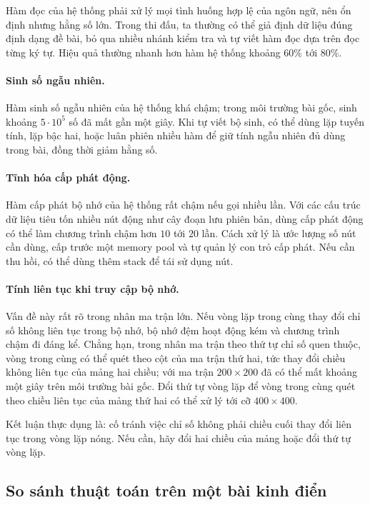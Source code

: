 \documentclass[11pt]{article}
\begin{document}
Hàm đọc của hệ thống phải xử lý mọi tình huống hợp lệ của ngôn ngữ, nên ổn
định nhưng hằng số lớn. Trong thi đấu, ta thường có thể giả định dữ liệu đúng
định dạng đề bài, bỏ qua nhiều nhánh kiểm tra và tự viết hàm đọc dựa trên đọc
từng ký tự. Hiệu quả thường nhanh hơn hàm hệ thống khoảng \(60\%\) tới \(80\%\).

\paragraph{Sinh số ngẫu nhiên.}
Hàm sinh số ngẫu nhiên của hệ thống khá chậm; trong môi trường bài gốc, sinh
khoảng \(5\cdot10^5\) số đã mất gần một giây. Khi tự viết bộ sinh, có thể dùng
lặp tuyến tính, lặp bậc hai, hoặc luân phiên nhiều hàm để giữ tính ngẫu nhiên
đủ dùng trong bài, đồng thời giảm hằng số.

\paragraph{Tĩnh hóa cấp phát động.}
Hàm cấp phát bộ nhớ của hệ thống rất chậm nếu gọi nhiều lần. Với các cấu trúc
dữ liệu tiêu tốn nhiều nút động như cây đoạn lưu phiên bản, dùng cấp phát động
có thể làm chương trình chậm hơn \(10\) tới \(20\) lần. Cách xử lý là ước lượng
số nút cần dùng, cấp trước một memory pool và tự quản lý con trỏ cấp phát. Nếu
cần thu hồi, có thể dùng thêm stack để tái sử dụng nút.

\paragraph{Tính liên tục khi truy cập bộ nhớ.}
Vấn đề này rất rõ trong nhân ma trận lớn. Nếu vòng lặp trong cùng thay đổi chỉ
số không liên tục trong bộ nhớ, bộ nhớ đệm hoạt động kém và chương trình chậm
đi đáng kể. Chẳng hạn, trong nhân ma trận theo thứ tự chỉ số quen thuộc, vòng
trong cùng có thể quét theo cột của ma trận thứ hai, tức thay đổi chiều không
liên tục của mảng hai chiều; với ma trận \(200\times200\) đã có thể mất khoảng
một giây trên môi trường bài gốc. Đổi thứ tự vòng lặp để vòng trong cùng quét
theo chiều liên tục của mảng thứ hai có thể xử lý tới cỡ \(400\times400\).

Kết luận thực dụng là: cố tránh việc chỉ số không phải chiều cuối thay đổi liên
tục trong vòng lặp nóng. Nếu cần, hãy đổi hai chiều của mảng hoặc đổi thứ tự
vòng lặp.

\subsection{So sánh thuật toán trên một bài kinh điển}
\end{document}
